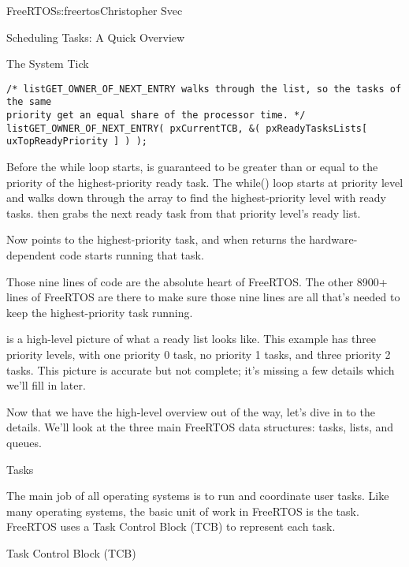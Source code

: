 \begin{aosachapter}{FreeRTOS}{s:freertos}{Christopher Svec}
\begin{aosasect1}{Scheduling Tasks: A Quick Overview}
\begin{aosasect2}{The System Tick}
\begin{verbatim}
/* listGET_OWNER_OF_NEXT_ENTRY walks through the list, so the tasks of the same 
priority get an equal share of the processor time. */
listGET_OWNER_OF_NEXT_ENTRY( pxCurrentTCB, &( pxReadyTasksLists[ uxTopReadyPriority ] ) );
\end{verbatim}

Before the while loop starts,  is guaranteed
to be greater than or equal to the priority of the highest-priority
ready task. The while() loop starts at priority level
 and walks down through the
 array to find the highest-priority level
with ready tasks.  then grabs
the next ready task from that priority level's ready list.

Now  points to the highest-priority task, and when
 returns the hardware-dependent code starts
running that task.

Those nine lines of code are the absolute heart of FreeRTOS. The other
8900+ lines of FreeRTOS are there to make sure those nine lines are
all that's needed to keep the highest-priority task running.

\end{aosasect2}

 is a high-level picture of what a
ready list looks like. This example has three priority levels, with
one priority 0 task, no priority 1 tasks, and three priority 2
tasks. This picture is accurate but not complete; it's missing a few
details which we'll fill in later.


Now that we have the high-level overview out of the way, let's dive in
to the details.  We'll look at the three main FreeRTOS data
structures: tasks, lists, and queues.

\end{aosasect1}

\begin{aosasect1}{Tasks}

The main job of all operating systems is to run and coordinate user
tasks. Like many operating systems, the basic unit of work in FreeRTOS
is the task. FreeRTOS uses a Task Control Block (TCB) to represent
each task. 

\begin{aosasect2}{Task Control Block (TCB)}


\end{aosasect2}
\end{aosasect1}
\end{aosachapter}
